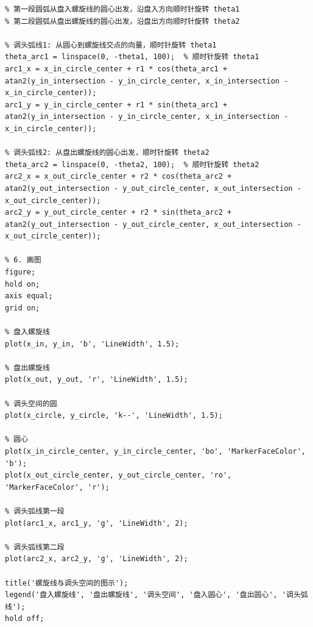 \documentclass{cumcmthesis1}
\begin{document}
\begin{lstlisting}[caption={画出求得的最短调头路径的代码}, label={lst:seventh_code}]
% 5. 计算两段圆弧
% 第一段圆弧从盘入螺旋线的圆心出发，沿盘入方向顺时针旋转 theta1
% 第二段圆弧从盘出螺旋线的圆心出发，沿盘出方向顺时针旋转 theta2

% 调头弧线1: 从圆心到螺旋线交点的向量，顺时针旋转 theta1
theta_arc1 = linspace(0, -theta1, 100);  % 顺时针旋转 theta1
arc1_x = x_in_circle_center + r1 * cos(theta_arc1 + atan2(y_in_intersection - y_in_circle_center, x_in_intersection - x_in_circle_center));
arc1_y = y_in_circle_center + r1 * sin(theta_arc1 + atan2(y_in_intersection - y_in_circle_center, x_in_intersection - x_in_circle_center));

% 调头弧线2: 从盘出螺旋线的圆心出发，顺时针旋转 theta2
theta_arc2 = linspace(0, -theta2, 100);  % 顺时针旋转 theta2
arc2_x = x_out_circle_center + r2 * cos(theta_arc2 + atan2(y_out_intersection - y_out_circle_center, x_out_intersection - x_out_circle_center));
arc2_y = y_out_circle_center + r2 * sin(theta_arc2 + atan2(y_out_intersection - y_out_circle_center, x_out_intersection - x_out_circle_center));

% 6. 画图
figure;
hold on;
axis equal;
grid on;

% 盘入螺旋线
plot(x_in, y_in, 'b', 'LineWidth', 1.5);

% 盘出螺旋线
plot(x_out, y_out, 'r', 'LineWidth', 1.5);

% 调头空间的圆
plot(x_circle, y_circle, 'k--', 'LineWidth', 1.5);

% 圆心
plot(x_in_circle_center, y_in_circle_center, 'bo', 'MarkerFaceColor', 'b');
plot(x_out_circle_center, y_out_circle_center, 'ro', 'MarkerFaceColor', 'r');

% 调头弧线第一段
plot(arc1_x, arc1_y, 'g', 'LineWidth', 2);

% 调头弧线第二段
plot(arc2_x, arc2_y, 'g', 'LineWidth', 2);

title('螺旋线与调头空间的图示');
legend('盘入螺旋线', '盘出螺旋线', '调头空间', '盘入圆心', '盘出圆心', '调头弧线');
hold off;

\end{lstlisting}
\end{document}
